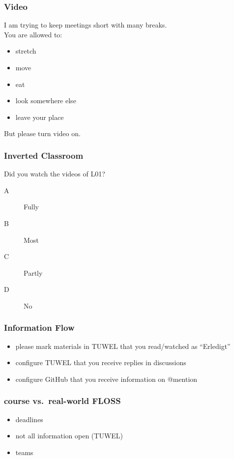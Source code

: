 \begin{assignment}
	\frametitle{Video}
	I am trying to keep meetings short with many breaks. \\
	You are allowed to:
	\begin{itemize}
		\item stretch
		\item move
		\item eat
		\item look somewhere else
		\item leave your place
	\end{itemize}

	\begin{task}
	But please turn video on.
	\end{task}
\end{assignment}

\begin{frame}
	\frametitle{Inverted Classroom}

	\begin{task}
	Did you watch the videos of L01?

	\begin{description}
	\item[A] Fully
	\item[B] Most
	\item[C] Partly
	\item[D] No
	\end{description}
	\end{task}
\end{frame}

\begin{frame}
	\frametitle{Information Flow}

	\begin{task}
	\begin{itemize}[<+-| alert@+>]
		\item please mark materials in TUWEL that you read/watched as ``Erledigt''
		\item configure TUWEL that you receive replies in discussions
		\item configure GitHub that you receive information on @mention
	\end{itemize}

	\end{task}
\end{frame}

\begin{frame}
	\frametitle{course vs.\ real-world FLOSS}

	\begin{task}
	\begin{itemize}[<+-| alert@+>]
		\item deadlines
		\item not all information open (TUWEL)
		\item teams
	\end{itemize}

	\end{task}
\end{frame}

